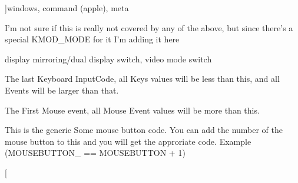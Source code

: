 \begin{Desc}
\begin{description}
{}]windows, command (apple), meta \item[{\em 
\hypertarget{classphys_1_1MetaCode_a3e501cbb5bf0f6f1fdb7211465bda8d8a9e26ea2006e876ccaa80fe4ae441da46}{
KEY\_\-MODE}
\label{da/dc9/classphys_1_1MetaCode_a3e501cbb5bf0f6f1fdb7211465bda8d8a9e26ea2006e876ccaa80fe4ae441da46}
}]I'm not sure if this is really not covered by any of the above, but since there's a special KMOD\_\-MODE for it I'm adding it here \item[{\em 
\hypertarget{classphys_1_1MetaCode_a3e501cbb5bf0f6f1fdb7211465bda8d8aadc4c974c86930fa73a693b7db4f7755}{
KEY\_\-DISPLAYSWITCH}
\label{da/dc9/classphys_1_1MetaCode_a3e501cbb5bf0f6f1fdb7211465bda8d8aadc4c974c86930fa73a693b7db4f7755}
}]display mirroring/dual display switch, video mode switch \item[{\em 
\hypertarget{classphys_1_1MetaCode_a3e501cbb5bf0f6f1fdb7211465bda8d8ac5e120aa1595bf2aa260df14b4a3498b}{
KEY\_\-LAST}
\label{da/dc9/classphys_1_1MetaCode_a3e501cbb5bf0f6f1fdb7211465bda8d8ac5e120aa1595bf2aa260df14b4a3498b}
}]The last Keyboard InputCode, all Keys values will be less than this, and all Events will be larger than that. \item[{\em 
\hypertarget{classphys_1_1MetaCode_a3e501cbb5bf0f6f1fdb7211465bda8d8a1bb7f008c7d430e886141a3b8b697129}{
MOUSE\_\-FIRST}
\label{da/dc9/classphys_1_1MetaCode_a3e501cbb5bf0f6f1fdb7211465bda8d8a1bb7f008c7d430e886141a3b8b697129}
}]The First Mouse event, all Mouse Event values will be more than this. \item[{\em 
\hypertarget{classphys_1_1MetaCode_a3e501cbb5bf0f6f1fdb7211465bda8d8a9cc80a2db206fb540fbb92a8ff64268a}{
MOUSEBUTTON}
\label{da/dc9/classphys_1_1MetaCode_a3e501cbb5bf0f6f1fdb7211465bda8d8a9cc80a2db206fb540fbb92a8ff64268a}
}]This is the generic Some mouse button code. You can add the number of the mouse button to this and you will get the approriate code. Example (MOUSEBUTTON\_ == MOUSEBUTTON + 1) \item[{\em 
}
\end{description}
\end{Desc}
